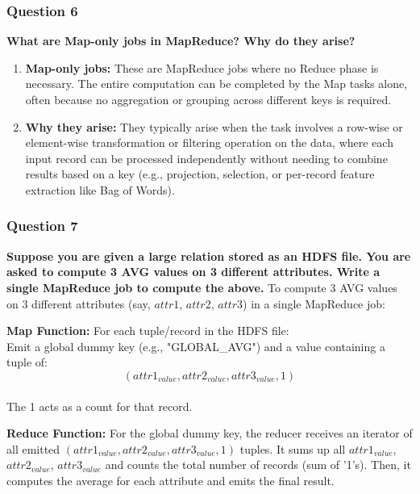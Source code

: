 \documentclass{article}
\begin{document}
\subsubsection*{Question 6}
\textbf{What are Map-only jobs in MapReduce? Why do they arise?}
    \begin{enumerate}[label=\alph*)]
        \item \textbf{Map-only jobs:} These are MapReduce jobs where no Reduce phase is necessary. The entire computation can be completed by the Map tasks alone, often because no aggregation or grouping across different keys is required.
        \item \textbf{Why they arise:} They typically arise when the task involves a row-wise or element-wise transformation or filtering operation on the data, where each input record can be processed independently without needing to combine results based on a key (e.g., projection, selection, or per-record feature extraction like Bag of Words).
    \end{enumerate}

\subsubsection*{Question 7}
\textbf{Suppose you are given a large relation stored as an HDFS file. You are asked to compute 3 AVG values on 3 different attributes. Write a single MapReduce job to compute the above.}
    To compute 3 AVG values on 3 different attributes (say, $attr1$, $attr2$, $attr3$) in a single MapReduce job:

    \textbf{Map Function:}
    For each tuple/record in the HDFS file: \\

    Emit a global dummy key (e.g., "GLOBAL\_AVG") and a value containing a tuple of:
    $$(attr1_{value}, attr2_{value}, attr3_{value}, 1)$$\\
    The 1 acts as a count for that record.
    
     \textbf{Reduce Function:}
    For the global dummy key, the reducer receives an iterator of all emitted $(attr1_{value}, attr2_{value}, attr3_{value}, 1)$ tuples.
    It sums up all $attr1_{value}$, $attr2_{value}$, $attr3_{value}$ and counts the total number of records (sum of '1's).
    Then, it computes the average for each attribute and emits the final result.
\end{document}
